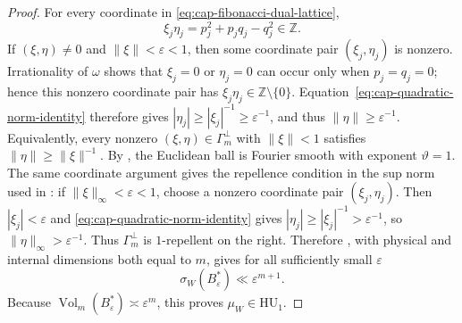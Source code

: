 \documentclass[11pt,reqno,a4paper]{amsart}
\numberwithin{equation}{section}
\theoremstyle{compact}
\theoremstyle{definition}
\theoremstyle{definition}
\newcommand{\HU}{\mathrm{HU}}
\newcommand{\Vol}{\operatorname{Vol}}
\begin{document}
\begin{proof}
For every coordinate in \eqref{eq:cap-fibonacci-dual-lattice},
\begin{equation}\label{eq:cap-quadratic-norm-identity}
  \xi_j\eta_j
  =p_j^2+p_jq_j-q_j^2\in\mathbb Z.
\end{equation}
If \((\xi,\eta)\neq0\) and \(\|\xi\|<\varepsilon<1\), then some coordinate
pair \((\xi_j,\eta_j)\) is nonzero.  Irrationality of \(\omega\) shows that
\(\xi_j=0\) or \(\eta_j=0\) can occur only when \(p_j=q_j=0\); hence this
nonzero coordinate pair has \(\xi_j\eta_j\in\mathbb Z\setminus\{0\}\).
Equation~\eqref{eq:cap-quadratic-norm-identity} therefore gives
\(|\eta_j|\geq|\xi_j|^{-1}\geq\varepsilon^{-1}\), and thus
\(\|\eta\|\geq\varepsilon^{-1}\).  Equivalently, every nonzero
\((\xi,\eta)\in\Gamma_m^\perp\) with \(\|\xi\|<1\) satisfies
\(\|\eta\|\geq\|\xi\|^{-1}\).  By \cite[Remark~3.5]{BH24}, the Euclidean ball is Fourier smooth with
exponent $\vartheta=1$.  The same coordinate argument gives the repellence
condition in the sup norm used in \cite[Definition~1.8]{BH24}: if
$\|\xi\|_\infty<\varepsilon<1$, choose a nonzero coordinate pair
$(\xi_j,\eta_j)$.  Then $|\xi_j|<\varepsilon$ and
\eqref{eq:cap-quadratic-norm-identity} gives
$|\eta_j|\geq|\xi_j|^{-1}>\varepsilon^{-1}$, so
$\|\eta\|_\infty>\varepsilon^{-1}$.  Thus $\Gamma_m^\perp$ is
$1$-repellent on the right.  Therefore \cite[Theorem~5.1]{BH24}, with
physical and internal dimensions both equal to $m$, gives for all sufficiently
small $\varepsilon$
\begin{equation}\label{eq:cap-higher-ball-hu1-bound}
  \sigma_W(B_\varepsilon^*)\ll\varepsilon^{m+1}.
\end{equation}
Because \(\Vol_m(B_\varepsilon^*)\asymp\varepsilon^m\), this proves
\(\mu_W\in\HU_1\).


\end{proof}
\end{document}
